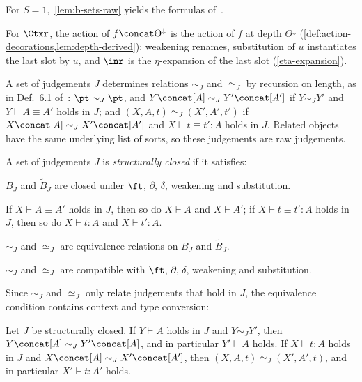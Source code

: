 \begin{remark}
    For $S = 1$,~\cref{lem:b-sets-raw} yields the formulas of~\cite[Thm.~6.10]{Voevodsky2016Relative}.
\end{remark}


For $\Ctxr$, the action of $f \concat \Theta^{\downarrow}$ is the action of $f$ at depth $\Theta^{\downarrow}$ (\cref{def:action-decorations,lem:depth-derived}): weakening renames, substitution of $u$ instantiates the last slot by $u$, and $\inr$ is the $\eta$-expansion of the last slot (\cref{eta-expansion}).

A set of judgements $J$ determines relations $\sim_J$ and $\simeq_J$ by recursion on length, as in Def.~6.1 of~\cite{Voevodsky2014Module}: $\pt \sim_J \pt$, and $Y \concat [A] \sim_J Y' \concat [A']$ if $Y \sim_J Y'$ and $Y \vdash A \equiv A'$ holds in $J$; and $(X, A, t) \simeq_J (X', A', t')$ if $X \concat [A] \sim_J X' \concat [A']$ and $X \vdash t \equiv t' : A$ holds in $J$. Related objects have the same underlying list of sorts, so these judgements are raw judgements.

\begin{definition}\label{def:structurally-closed}
    A set of judgements $J$ is \emph{structurally closed} if it satisfies:
    \begin{description}[font=\normalfont\itshape]
        \item[Closure.] $B_J$ and $\widetilde{B}_J$ are closed under $\ft$, $\partial$, $\delta$, weakening and substitution.
        \item[Presupposition.] If $X \vdash A \equiv A'$ holds in $J$, then so do $X \vdash A$ and $X \vdash A'$; if $X \vdash t \equiv t' : A$ holds in $J$, then so do $X \vdash t : A$ and $X \vdash t' : A$.
        \item[Equivalence.] $\sim_J$ and $\simeq_J$ are equivalence relations on $B_J$ and $\widetilde{B}_J$.
        \item[Compatibility.] $\sim_J$ and $\simeq_J$ are compatible with $\ft$, $\partial$, $\delta$, weakening and substitution.
    \end{description}
\end{definition}

Since $\sim_J$ and $\simeq_J$ only relate judgements that hold in $J$, the equivalence condition contains context and type conversion:

\begin{lemma}\label{lem:conversion}
    Let $J$ be structurally closed. If $Y \vdash A$ holds in $J$ and $Y \sim_J Y'$, then $Y \concat [A] \sim_J Y' \concat [A]$, and in particular $Y' \vdash A$ holds. If $X \vdash t : A$ holds in $J$ and $X \concat [A] \sim_J X' \concat [A']$, then $(X, A, t) \simeq_J (X', A', t)$, and in particular $X' \vdash t : A'$ holds.
\end{lemma}

